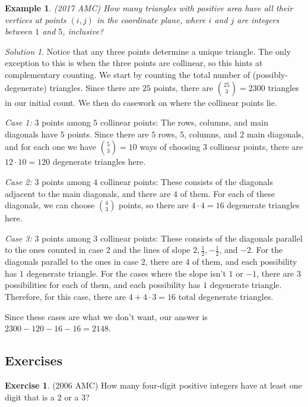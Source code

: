 \documentclass[letterpaper]{article}
\newtheorem{example}[thm]{Example}
\theoremstyle{remark}
\newtheorem*{solution}{Solution}
\theoremstyle{definition}
\newtheorem{exercise}[thm]{Exercise}
\begin{document}
\begin{example}
(2017 AMC) How many triangles with positive area have all their vertices at points $(i,j)$ in the coordinate plane, where $i$ and $j$ are integers between $1$ and $5$, inclusive?
\end{example}

\begin{solution}
Notice that any three points determine a unique triangle. The only exception to this is when the three points are collinear, so this hints at complementary counting. We start by counting the total number of (possibly-degenerate) triangles. Since there are $25$ points, there are $\binom{25}{3}=2300$ triangles in our initial count. We then do casework on where the collinear points lie.

\textit{Case 1:} $3$ points among $5$ collinear points: The rows, columns, and main diagonals have $5$ points. Since there are $5$ rows, $5$, columns, and $2$ main diagonals, and for each one we have $\binom{5}{3}=10$ ways of choosing $3$ collinear points, there are $12\cdot10=120$ degenerate triangles here.
\newline

\textit{Case 2:} $3$ points among $4$ collinear points: These consists of the diagonals adjacent to the main diagonals, and there are $4$ of them. For each of these diagonals, we can choose $\binom{4}{3}$ points, so there are $4\cdot 4=16$ degenerate triangles here.

\textit{Case 3:} $3$ points among $3$ collinear points: These consists of the diagonals parallel to the ones counted in case $2$ and the lines of slope $2,\frac{1}{2}, -\frac{1}{2}$, and $-2$. For the diagonals parallel to the ones in case $2$, there are $4$ of them, and each possibility has $1$ degenerate triangle. For the cases where the slope isn't $1$ or $-1$, there are $3$ possibilities for each of them, and each possibility has $1$ degenerate triangle. Therefore, for this case, there are $4+4\cdot3=16$ total degenerate triangles.

Since these cases are what we don't want, our answer is $2300-120-16-16=2148$.
\end{solution}

\subsection*{Exercises}
\begin{exercise}
(2006 AMC) How many four-digit positive integers have at least one digit that is a $2$ or a $3$?
\end{exercise}
\end{document}
